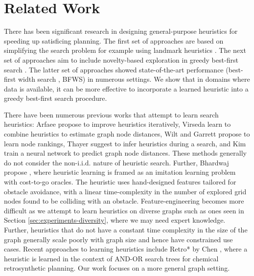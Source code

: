 \section{Related Work}

 There has been significant research in designing general-purpose heuristics for speeding up satisficing planning. The first set of approaches are based on simplifying the search problem for example using landmark heuristics \cite{bonet2001planning, richter2010lama}. The next set of approaches aim to include novelty-based exploration in greedy best-first search \cite{xie2012planning, xie2014adding, lipovetzky2017best, teichteil2021boundary}. The latter set of approaches showed state-of-the-art performance (best-first width search \cite{lipovetzky2017best, teichteil2021boundary}, BFWS) in numerous settings. We show that in domains where data is available, it can be more effective to incorporate a learned heuristic into a greedy best-first search procedure.


 There have been numerous previous works that attempt to learn search heuristics: Arfaee \etal \cite{arfaee2011learning} propose to improve heuristics iteratively, Virseda \etal  \cite{us2013learning} learn to combine heuristics to estimate graph node distances, Wilt \etal \cite{wilt2015building} and Garrett \etal \cite{garrett2016learning} propose to learn node rankings, Thayer \etal \cite{thayer2011learning} suggest to infer heuristics during a search, and Kim \etal \cite{KimA20} train a neural network to predict graph node distances. These methods generally do not consider the non-i.i.d. nature of heuristic search. Further, Bhardwaj \etal \cite{bhardwaj2017learning} propose \sail, where heuristic learning is framed as an imitation learning problem with cost-to-go oracles. The \sail heuristic uses hand-designed features tailored for obstacle avoidance, with a linear time-complexity in the number of explored grid nodes found to be colliding with an obstacle. Feature-engineering becomes more difficult as we attempt to learn heuristics on diverse graphs such as ones seen in Section \ref{sec:experiments-diversity}, where we may need expert knowledge. Further, heuristics that do not have a constant time complexity in the size of the graph \cite{bhardwaj2017learning, ariki2019fully, terasawa20203d, yonetani2020path, archetti2021neural} generally scale poorly with graph size and hence have constrained use cases. Recent approaches to learning heuristics include Retro* \cite{chen2020retro} by Chen \etal, where a heuristic is learned in the context of AND-OR search trees for chemical retrosynthetic planning. Our work focuses on a more general graph setting.

